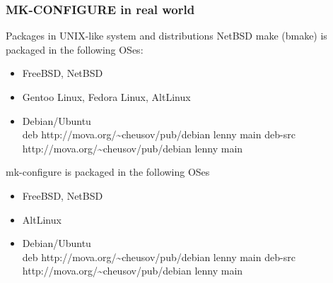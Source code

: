 \documentclass[hyperref={colorlinks=true}]{beamer}
\begin{document}

\begin{frame}[fragile,t]
  \frametitle{MK-CONFIGURE in real world}
  \begin{block}{Packages in UNIX-like system and distributions}
    NetBSD make (bmake) is packaged in the following OSes:
    \begin{itemize}
    \item FreeBSD, NetBSD
    \item Gentoo Linux, Fedora Linux, AltLinux
    \item Debian/Ubuntu\\
      deb http://mova.org/\~{}cheusov/pub/debian lenny main
      deb-src http://mova.org/\~{}cheusov/pub/debian lenny main
    \end{itemize}
    mk-configure is packaged in the following OSes
    \begin{itemize}
    \item FreeBSD, NetBSD
    \item AltLinux
    \item Debian/Ubuntu\\
      deb http://mova.org/\~{}cheusov/pub/debian lenny main
      deb-src http://mova.org/\~{}cheusov/pub/debian lenny main
    \end{itemize}
  \end{block}
\end{frame}

\end{document}
